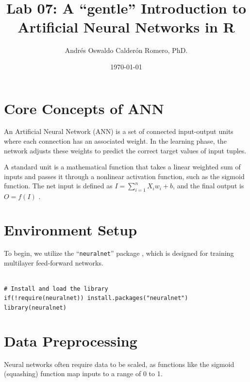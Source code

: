\documentclass{article}
\title{Lab 07: A ``gentle'' Introduction to Artificial Neural Networks in R}
\author{Andrés Oswaldo Calderón Romero, PhD.}
\date{\today}
\begin{document}
\maketitle

\section{Core Concepts of ANN}
An Artificial Neural Network (ANN) is a set of connected input-output units where each connection has an associated weight. In the learning phase, the network adjusts these weights to predict the correct target values of input tuples.

A standard unit is a mathematical function that takes a linear weighted sum of inputs and passes it through a nonlinear activation function, such as the sigmoid function. The net input is defined as $I = \sum_{i=1}^{n} X_i w_i + b$, and the final output is $O = f(I)$ \parencite{fritsch2010neuralnet}.

\section{Environment Setup}
To begin, we utilize the ``\texttt{neuralnet}'' package \parencite{fritsch2019neuralnet}, which is designed for training multilayer feed-forward networks.

\begin{listing}[H]
    \begin{verbatim}

# Install and load the library
if(!require(neuralnet)) install.packages("neuralnet")
library(neuralnet)

    \end{verbatim}
    \caption{Environment setup and library initialization. This step involves installing and loading the ``\texttt{neuralnet}'' package required for training feed-forward networks.}
\end{listing}

\section{Data Preprocessing}
Neural networks often require data to be scaled, as functions like the sigmoid (squashing) function map inputs to a range of 0 to 1.
\end{document}
